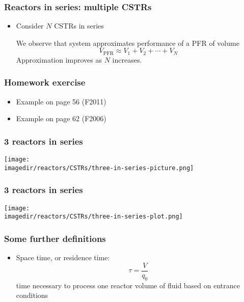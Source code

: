 \begin{frame}\frametitle{Reactors in series: multiple CSTRs}
	\begin{itemize}
		\item	Consider $N$ CSTRs in series

		We observe that system approximates performance of a PFR of volume $$V_\text{PFR} \approx V_1 + V_2 + \cdots + V_N$$ Approximation improves as $N$ increases.
	\end{itemize}
\end{frame}

\begin{frame}\frametitle{Homework exercise}
	\begin{itemize}
		\item	Example on page 56 (F2011)
		\item	Example on page 62 (F2006)
	\end{itemize}
\end{frame}

\begin{frame}\frametitle{3 reactors in series}
	\begin{center}
		\texttt{[image: \\imagedir/reactors/CSTRs/three-in-series-picture.png]}
	\end{center}
\end{frame}

\begin{frame}\frametitle{3 reactors in series}
	\begin{center}
		\texttt{[image: \\imagedir/reactors/CSTRs/three-in-series-plot.png]}
	\end{center}
\end{frame}

\begin{frame}\frametitle{Some further definitions}
	\begin{itemize}
		\item	Space time, or residence time:
		$$\tau = \frac{V}{q_0}$$ time necessary to process one reactor volume of fluid based on entrance conditions
	\end{itemize}
\end{frame}
